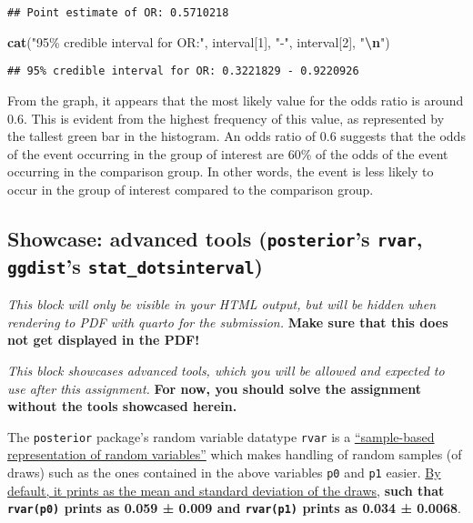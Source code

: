 \documentclass[
]{article}
\newenvironment{Shaded}{\begin{snugshade}}{\end{snugshade}}
\newcommand{\DecValTok}[1]{\textcolor[rgb]{0.00,0.00,0.81}{#1}}
\newcommand{\FunctionTok}[1]{\textcolor[rgb]{0.13,0.29,0.53}{\textbf{#1}}}
\newcommand{\NormalTok}[1]{#1}
\newcommand{\SpecialCharTok}[1]{\textcolor[rgb]{0.81,0.36,0.00}{\textbf{#1}}}
\newcommand{\StringTok}[1]{\textcolor[rgb]{0.31,0.60,0.02}{#1}}
\begin{document}
\begin{verbatim}
## Point estimate of OR: 0.5710218
\end{verbatim}

\begin{Shaded}
\begin{Highlighting}[]
\FunctionTok{cat}\NormalTok{(}\StringTok{"95\% credible interval for OR:"}\NormalTok{, interval[}\DecValTok{1}\NormalTok{], }\StringTok{"{-}"}\NormalTok{, interval[}\DecValTok{2}\NormalTok{], }\StringTok{"}\SpecialCharTok{\textbackslash{}n}\StringTok{"}\NormalTok{)}
\end{Highlighting}
\end{Shaded}

\begin{verbatim}
## 95% credible interval for OR: 0.3221829 - 0.9220926
\end{verbatim}

From the graph, it appears that the most likely value for the odds ratio
is around 0.6. This is evident from the highest frequency of this value,
as represented by the tallest green bar in the histogram. An odds ratio
of 0.6 suggests that the odds of the event occurring in the group of
interest are 60\% of the odds of the event occurring in the comparison
group. In other words, the event is less likely to occur in the group of
interest compared to the comparison group.

\hypertarget{showcase-advanced-tools-posteriors-rvar-ggdists-stat_dotsinterval}{%
\subsection{\texorpdfstring{Showcase: advanced tools
(\texttt{posterior}'s \texttt{rvar}, \texttt{ggdist}'s
\texttt{stat\_dotsinterval})}{Showcase: advanced tools (posterior's rvar, ggdist's stat\_dotsinterval)}}\label{showcase-advanced-tools-posteriors-rvar-ggdists-stat_dotsinterval}}

\emph{This block will only be visible in your HTML output, but will be
hidden when rendering to PDF with quarto for the submission.}
\textbf{Make sure that this does not get displayed in the PDF!}

\emph{This block showcases advanced tools, which you will be allowed and
expected to use after this assignment.} \textbf{For now, you should
solve the assignment without the tools showcased herein.}

The \texttt{posterior} package's random variable datatype \texttt{rvar}
is a
\href{https://mc-stan.org/posterior/articles/rvar.html\#:~:text=sample\%2Dbased\%20representation\%20of\%20random\%20variables}{``sample-based
representation of random variables''} which makes handling of random
samples (of draws) such as the ones contained in the above variables
\texttt{p0} and \texttt{p1} easier.
\href{https://mc-stan.org/posterior/articles/rvar.html\#:~:text=The\%20default\%20display\%20of\%20an\%20rvar\%20shows\%20the\%20mean\%20and\%20standard\%20deviation\%20of\%20each\%20element\%20of\%20the\%20array.}{By
default, it prints as the mean and standard deviation of the draws},
\textbf{such that \texttt{rvar(p0)} prints as 0.059 ± 0.009 and
\texttt{rvar(p1)} prints as 0.034 ± 0.0068}.
\end{document}

